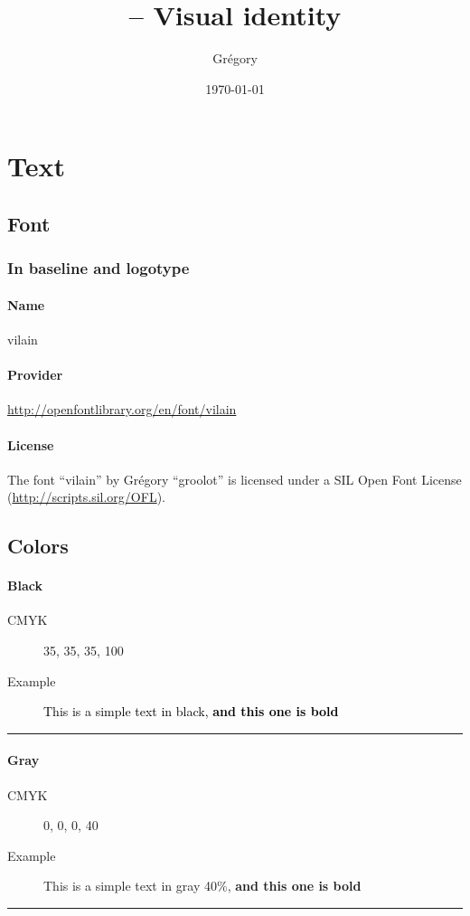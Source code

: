 \documentclass[a4paper,oneside,table]{article}
\author{Grégory \bsc{David}}
\title{\vilain{} -- Visual identity}
\date{\today{}}
\begin{document}
\maketitle{}
\tableofcontents{}

\newpage
\section{Text}
\subsection{Font}
\subsubsection{In baseline and logotype}
\paragraph{Name} vilain
\paragraph{Provider}
\url{http://openfontlibrary.org/en/font/vilain}
\paragraph{License} The font “vilain” by Grégory ``groolot''
 is licensed under a SIL Open Font License
(\url{http://scripts.sil.org/OFL}).

\subsection{Colors}
\paragraph{Black}
\begin{description}
    \item[CMYK] 35, 35, 35, 100
    \item[Example] \textcolor{black}{This is a simple text in
  black, \textbf{and this one is bold}}
\end{description}
\hrule

\paragraph{Gray}
\begin{description}
    \item[CMYK] 0, 0, 0, 40
    \item[Example] \textcolor{vilainGray}{This is a simple text in
  gray 40\%, \textbf{and this one is bold}}
\end{description}
\hrule
\end{document}
